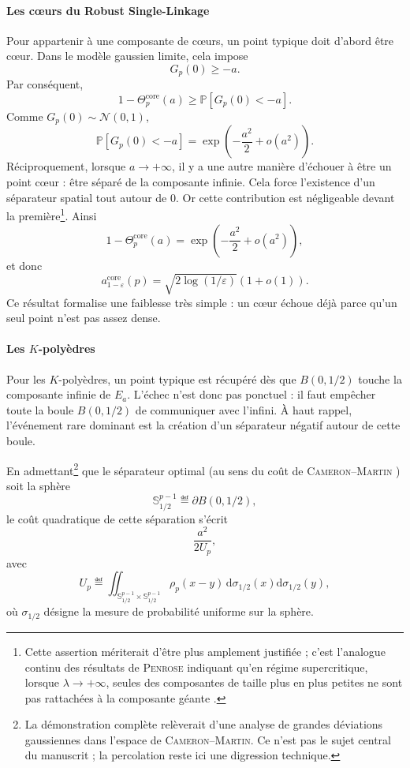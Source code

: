 \paragraph{Les cœurs du Robust Single-Linkage}
Pour appartenir à une composante de cœurs, un point typique doit d'abord être cœur. Dans le modèle gaussien limite, cela impose
\[
    G_p(0)\ge -a.
\]
Par conséquent,
\[
    1-\Theta_p^{\mathrm{core}}(a)
    \ge
    \mathbb P[G_p(0)<-a].
\]
Comme $G_p(0)\sim\mathcal N(0,1)$,
\[
    \mathbb P[G_p(0)<-a]
    =
    \exp\left(-\frac{a^2}{2}+o(a^2)\right).
\]
Réciproquement, lorsque $a\to+\infty$, il y a une autre manière d'échouer à être un point cœur : être séparé de la composante infinie. Cela force l'existence d'un séparateur spatial tout autour de $0$. Or cette contribution est négligeable devant la première\footnote{Cette assertion mériterait d'être plus amplement justifiée ; c'est l'analogue continu des résultats de \textsc{Penrose} indiquant qu'en régime supercritique, lorsque $\lambda \to +\infty$, seules des composantes de taille plus en plus petites ne sont pas rattachées à la composante géante \cite{penrose2003, Penrose2025, PenroseKclusters}.}. Ainsi
\[
    1-\Theta_p^{\mathrm{core}}(a)
    =
    \exp\left(-\frac{a^2}{2}+o(a^2)\right),
\]
et donc
\[
    a_{1-\varepsilon}^{\mathrm{core}}(p)
    =
    \sqrt{2\log(1/\varepsilon)}(1+o(1)).
\]
Ce résultat formalise une faiblesse très simple : un cœur échoue déjà parce qu'un seul point n'est pas assez dense.

\paragraph{Les $K$-polyèdres}
Pour les $K$-polyèdres, un point typique est récupéré dès que $B(0,1/2)$ touche la composante infinie de $E_a$. L'échec n'est donc pas ponctuel : il faut empêcher toute la boule $B(0,1/2)$ de communiquer avec l'infini. À haut rappel, l'événement rare dominant est la création d'un séparateur négatif autour de cette boule.

En admettant\footnote{La démonstration complète relèverait d'une analyse de grandes déviations gaussiennes dans l'espace de \textsc{Cameron--Martin}. Ce n'est pas le sujet central du manuscrit ; la percolation reste ici une digression technique.} que le séparateur optimal (au sens du coût de \textsc{Cameron--Martin} \cite{LedouxTalagrand1991, Lifshits2012, DemboZeitouni1998}) soit la sphère
\[
    \mathbb S^{p-1}_{1/2}\eqdef \partial B(0,1/2),
\]
le coût quadratique de cette séparation s'écrit
\[
    \frac{a^2}{2U_p},
\]
avec
\[
    U_p
    \eqdef
    \iint_{\mathbb S^{p-1}_{1/2}\times\mathbb S^{p-1}_{1/2}}
    \rho_p(x-y)\,
    \mathrm d\sigma_{1/2}(x) \mathrm d\sigma_{1/2}(y),
\]
où $\sigma_{1/2}$ désigne la mesure de probabilité uniforme sur la sphère.

